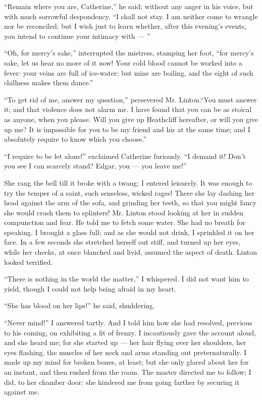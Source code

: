 \par “Remain where you are, Catherine,” he said; without any anger in his voice, but with much sorrowful despondency. “I shall not stay. I am neither come to wrangle nor be reconciled; but I wish just to learn whether, after this evening's events, you intend to continue your intimacy with — ”
\par “Oh, for mercy's sake,” interrupted the mistress, stamping her foot, “for mercy's sake, let us hear no more of it now! Your cold blood cannot be worked into a fever: your veins are full of ice-water; but mine are boiling, and the sight of such chillness makes them dance.”
\par “To get rid of me, answer my question,” persevered Mr. Linton.“You must answer it; and that violence does not alarm me. I have found that you can be as stoical as anyone, when you please. Will you give up Heathcliff hereafter, or will you give up me? It is impossible for you to be my friend and his at the same time; and I absolutely require to know which you choose.”
\par “I require to be let alone!” exclaimed Catherine furiously. “I demand it! Don't you see I can scarcely stand? Edgar, you — you leave me!”
\par She rang the bell till it broke with a twang; I entered leisurely. It was enough to try the temper of a saint, such senseless, wicked rages! There she lay dashing her head against the arm of the sofa, and grinding her teeth, so that you might fancy she would crash them to splinters! Mr. Linton stood looking at her in sudden compunction and fear. He told me to fetch some water. She had no breath for speaking. I brought a glass full; and as she would not drink, I sprinkled it on her face. In a few seconds she stretched herself out stiff, and turned up her eyes, while her cheeks, at once blanched and livid, assumed the aspect of death. Linton looked terrified.
\par “There is nothing in the world the matter,” I whispered. I did not want him to yield, though I could not help being afraid in my heart.
\par “She has blood on her lips!” he said, shuddering.
\par “Never mind!” I answered tartly. And I told him how she had resolved, previous to his coming, on exhibiting a fit of frenzy. I incautiously gave the account aloud, and she heard me; for she started up — her hair flying over her shoulders, her eyes flashing, the muscles of her neck and arms standing out preternaturally. I made up my mind for broken bones, at least; but she only glared about her for an instant, and then rushed from the room. The master directed me to follow; I did, to her chamber door: she hindered me from going farther by securing it against me.
